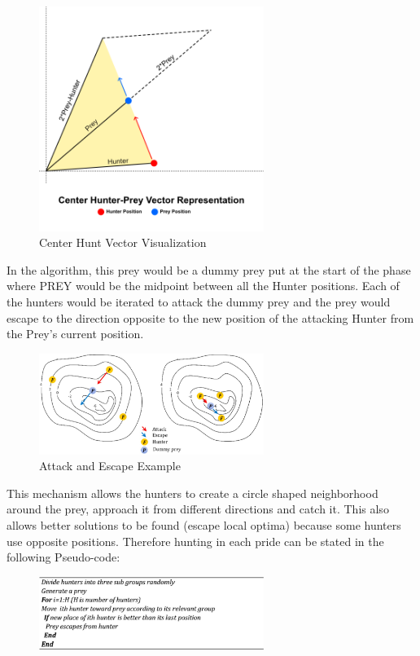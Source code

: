 \begin{figure}[h]
\begin{center}
\includegraphics[width=0.65\textwidth]{img/pa/center-hunt}
\caption{Center Hunt Vector Visualization}
\end{center}
\end{figure}



In the algorithm, this prey would be a dummy prey put at the start of the phase where PREY would be the midpoint between all the Hunter positions. Each of the hunters would be iterated to attack the dummy prey and the prey would escape to the direction opposite to the new position of the attacking Hunter from the Prey's current position.
\begin{figure}[h]
\begin{center}
\includegraphics[width=0.65\textwidth]{img/pa/hunting_attack}
\caption{Attack and Escape Example}
\end{center}
\end{figure}
This mechanism allows the hunters to create a circle shaped neighborhood around the prey, approach it from different directions and catch it. This also allows better solutions to be found (escape local optima) because some hunters use opposite positions.
Therefore hunting in each pride can be stated in the following Pseudo-code:
\begin{figure}[h]
\begin{center}
\includegraphics[width=0.65\textwidth]{img/pa/hunting_pseudo}
\end{center}
\end{figure}

